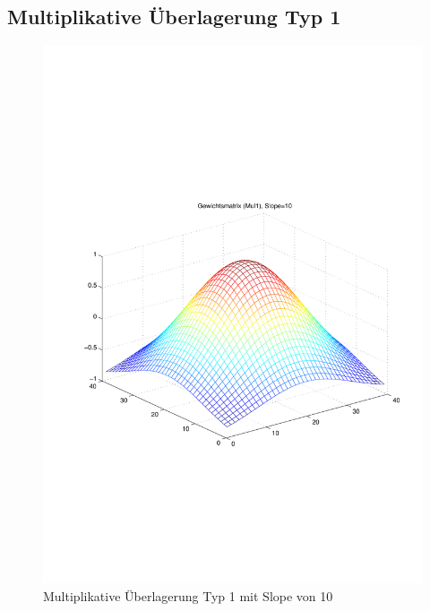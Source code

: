 \subsection{Multiplikative Überlagerung Typ 1}
\begin{figure}[hbt]
	\begin{minipage}{0.5 \textwidth}
		\includegraphics[width=\textwidth]{./Bilder/Auswertung/Gewichtsmatrix/Gewichtsmatrix_Mul1_Slope_10}
		\caption{Multiplikative Überlagerung Typ 1 mit Slope von 10}
		\label{Mul110}
	\end{minipage}
	\hfill
	\begin{minipage}{0.5 \textwidth}

\end{minipage}
\end{figure}
